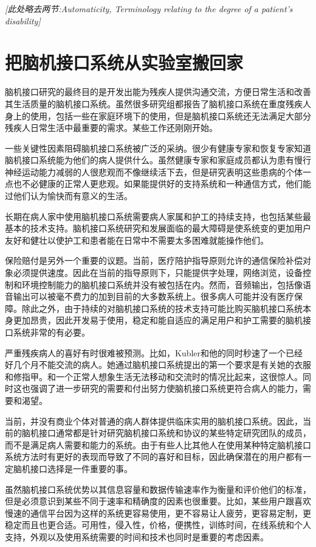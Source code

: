 \textit{[此处略去两节:Automaticity, Terminology relating to the degree of a patient’s disability]}

\section*{把脑机接口系统从实验室搬回家}
脑机接口研究的最终目的是开发出能为残疾人提供沟通交流，方便日常生活和改善其生活质量的脑机接口系统。虽然很多研究组都报告了脑机接口系统在重度残疾人身上的使用，包括一些在家庭环境下的使用，但是脑机接口系统还无法满足大部分残疾人日常生活中最重要的需求。某些工作还刚刚开始。

一些关键性因素阻碍脑机接口系统被广泛的采纳。很少有健康专家和恢复专家知道脑机接口系统能为他们的病人提供什么。虽然健康专家和家庭成员都认为患有慢行神经运动能力减弱的人很悲观而不像继续活下去，但是研究表明这些患病的个体一点也不必健康的正常人更悲观。如果能提供好的支持系统和一种通信方式，他们能过他们认为愉快而有意义的生活。

长期在病人家中使用脑机接口系统需要病人家属和护工的持续支持，也包括某些最基本的技术支持。脑机接口系统研究和发展面临的最大障碍是使系统变的更加用户友好和健壮以使护工和患者能在日常中不需要太多困难就能操作他们。

保险赔付是另外一个重要的议题。当前，医疗陪护指导原则允许的通信保险补偿对象必须提供速度。因此在当前的指导原则下，只能提供字处理，网络浏览，设备控制和环境控制能力的脑机接口系统并没有被包括在内。然而，音频输出，包括像语音输出可以被毫不费力的加到目前的大多数系统上。很多病人可能并没有医疗保障。除此之外，由于持续的对脑机接口系统的技术支持可能比购买脑机接口系统本身更加昂贵，因此开发易于使用，稳定和能自适应的满足用户和护工需要的脑机接口系统非常的有必要。

严重残疾病人的喜好有时很难被预测。比如，Kubler和他的同时秒速了一个已经好几个月不能交流的病人。她通过脑机接口系统提出的第一个要求是有关她的衣服和修指甲。和一个正常人想象生活无法移动和交流时的情况比起来，这很惊人。同时这也强调了进一步研究的需要和付出努力使脑机接口系统更符合病人的能力，需要和渴望。

当前，并没有商业个体对普通的病人群体提供临床实用的脑机接口系统。因此，当前的脑机接口通常都是针对研究脑机接口系统和协议的某些特定研究团队的成员，而不是满足病人需要和能力的系统。由于有些人比其他人在使用某种特定脑机接口系统方法时有更好的表现而导致了不同的喜好和目标，因此确保潜在的用户都有一定脑机接口选择是一件重要的事。

虽然脑机接口系统优势以其信息容量和数据传输速率作为衡量和评价他们的标准，但是必须意识到某些不同于速率和精确度的因素也很重要。比如，某些用户跟喜欢慢速的通信平台因为这样的系统更容易使用，更不容易让人疲劳，更容易定制，更稳定而且也更合适。可用性，侵入性，价格，便携性，训练时间，在线系统和个人支持，外观以及使用系统需要的时间和技术也同时是重要的考虑因素。

